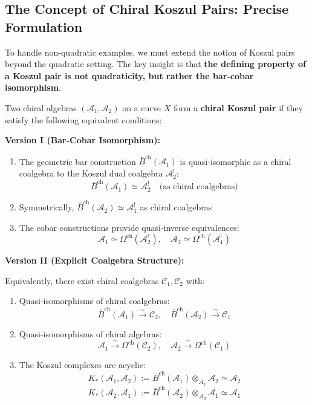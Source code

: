 \subsection{The Concept of Chiral Koszul Pairs: Precise Formulation}

To handle non-quadratic examples, we must extend the notion of Koszul pairs beyond the quadratic setting. The key insight is that \textbf{the defining property of a Koszul pair is not quadraticity, but rather the bar-cobar isomorphism}.

\begin{definition}\label{def:chiral-koszul-pair}
Two chiral algebras $(\mathcal{A}_1, \mathcal{A}_2)$ on a curve $X$ form a \textbf{chiral Koszul pair} if they satisfy the following equivalent conditions:

\medskip
\noindent\textbf{Version I (Bar-Cobar Isomorphism):}
\begin{enumerate}
\item The geometric bar construction $\bar{B}^{\text{ch}}(\mathcal{A}_1)$ is quasi-isomorphic as a chiral coalgebra to the Koszul dual coalgebra $\mathcal{A}_2^!$:
$$\bar{B}^{\text{ch}}(\mathcal{A}_1) \simeq \mathcal{A}_2^! \quad \text{(as chiral coalgebras)}$$

\item Symmetrically, $\bar{B}^{\text{ch}}(\mathcal{A}_2) \simeq \mathcal{A}_1^!$ as chiral coalgebras

\item The cobar constructions provide quasi-inverse equivalences:
$$\mathcal{A}_1 \simeq \Omega^{\text{ch}}(\mathcal{A}_2^!), \quad \mathcal{A}_2 \simeq \Omega^{\text{ch}}(\mathcal{A}_1^!)$$
\end{enumerate}

\medskip
\noindent\textbf{Version II (Explicit Coalgebra Structure):}

Equivalently, there exist chiral coalgebras $\mathcal{C}_1, \mathcal{C}_2$ with:
\begin{enumerate}
\item Quasi-isomorphisms of chiral coalgebras:
$$\bar{B}^{\text{ch}}(\mathcal{A}_1) \xrightarrow{\sim} \mathcal{C}_2, \quad \bar{B}^{\text{ch}}(\mathcal{A}_2) \xrightarrow{\sim} \mathcal{C}_1$$

\item Quasi-isomorphisms of chiral algebras:
$$\mathcal{A}_1 \xrightarrow{\sim} \Omega^{\text{ch}}(\mathcal{C}_2), \quad \mathcal{A}_2 \xrightarrow{\sim} \Omega^{\text{ch}}(\mathcal{C}_1)$$

\item The Koszul complexes are acyclic:
$$K_*(\mathcal{A}_1, \mathcal{A}_2) := \bar{B}^{\text{ch}}(\mathcal{A}_1) \otimes_{\mathcal{A}_1} \mathcal{A}_2 \simeq \mathcal{A}_2$$
$$K_*(\mathcal{A}_2, \mathcal{A}_1) := \bar{B}^{\text{ch}}(\mathcal{A}_2) \otimes_{\mathcal{A}_2} \mathcal{A}_1 \simeq \mathcal{A}_1$$
\end{enumerate}
\end{definition}

